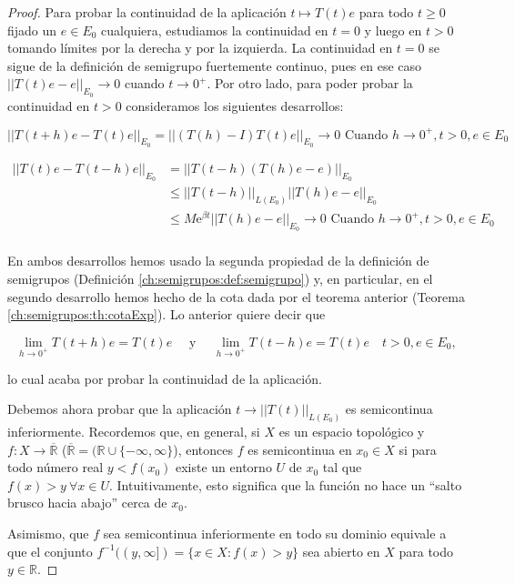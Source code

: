 \begin{proof}
    Para probar la continuidad de la aplicación $t \mapsto T(t)e$ para todo $t \geq 0$ fijado un $e \in E_0$ cualquiera, estudiamos la continuidad en $t = 0$ y luego en $t > 0$ tomando límites por la derecha y por la izquierda. La continuidad en $t = 0$ se sigue de la definición de semigrupo fuertemente continuo, pues en ese caso $||T(t)e - e||_{E_0} \rightarrow 0$ cuando $t \rightarrow 0^+$. Por otro lado, para poder probar la continuidad en $t > 0$ consideramos los siguientes desarrollos:

    \[
        ||T(t + h)e - T(t)e||_{E_0} = ||(T(h)-I)T(t)e||_{E_0} \rightarrow 0 \text{ Cuando } h \rightarrow 0^+, t >0, e \in E_0
    \]
    
    \begin{align*}
        ||T(t)e - T(t-h)e||_{E_0} &= ||T(t-h)(T(h)e - e)||_{E_0}\\
        &\leq ||T(t-h)||_{L(E_0)} ||T(h)e - e||_{E_0}\\
        &\leq M\mathrm{e}^{\beta t} ||T(h)e - e||_{E_0} \rightarrow 0 \text{ Cuando } h \rightarrow 0^+, t >0, e \in E_0\\
    \end{align*}

    En ambos desarrollos hemos usado la segunda propiedad de la definición de semigrupos (Definición \ref{ch:semigrupos:def:semigrupo}) y, en particular, en el segundo desarrollo hemos hecho de la cota dada por el teorema anterior (Teorema \ref{ch:semigrupos:th:cotaExp}). Lo anterior quiere decir que 

    \[\lim_{h\rightarrow 0^+} T(t+h)e = T(t)e \quad \text{ y } \quad \lim_{h\rightarrow 0^+} T(t-h)e = T(t)e \quad t>0, e \in E_0,\]

    lo cual acaba por probar la continuidad de la aplicación.

    Debemos ahora probar que la aplicación $t \rightarrow ||T(t)||_{L(E_0)}$ es semicontinua inferiormente. Recordemos que, en general, si $X$ es un espacio topológico y $f : X \rightarrow \overline{\mathbb{R}}$ ($\overline{\mathbb{R}} = (\mathbb{R} \cup \{-\infty, \infty\}$), entonces $f$ es semicontinua en $x_0 \in X$ si para todo número real $y < f(x_0)$ existe un entorno $U$ de $x_0$ tal que $f(x) > y \ \forall x \in U$. Intuitivamente, esto significa que la función no hace un ``salto brusco hacia abajo'' cerca de $x_0$.

    Asimismo, que $f$ sea semicontinua inferiormente en todo su dominio equivale a que el conjunto $f^{-1}((y, \infty]) = \{x \in X : f(x) > y\}$ sea abierto en $X$ para todo $y \in \mathbb{R}$.


\end{proof}
